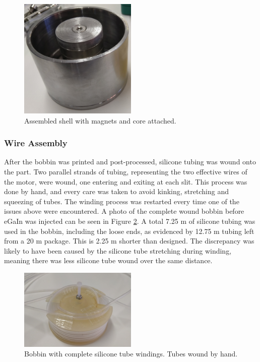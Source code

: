 \documentclass[a4paper,12pt]{article}
\begin{document}
\begin{figure}[h!]
    \centering
    \includegraphics[width=0.5\textwidth]{assembledshell.jpg}
    \caption{Assembled shell with magnets and core attached.}
    \label{fg:assembledshell}
\end{figure}

\subsubsection{Wire Assembly}

After the bobbin was printed and post-processed, silicone tubing was wound onto the part. Two parallel strands of tubing, representing the two effective wires of the motor, were wound, one entering and exiting at each slit. This process was done by hand, and every care was taken to avoid kinking, stretching and squeezing of tubes. The winding process was restarted every time one of the issues above were encountered. A photo of the complete wound bobbin before eGaIn was injected can be seen in Figure \ref{fg:assembledbobbin}. A total 7.25 m of silicone tubing was used in the bobbin, including the loose ends, as evidenced by 12.75 m tubing left from a 20 m package. This is 2.25 m shorter than designed. The discrepancy was likely to have been caused by the silicone tube stretching during winding, meaning there was less silicone tube wound over the same distance.

\begin{figure}[h!]
    \centering
    \includegraphics[width=0.5\textwidth]{assembledbobbin.jpg}
    \caption{Bobbin with complete silicone tube windings. Tubes wound by hand.}
    \label{fg:assembledbobbin}
\end{figure}
\end{document}
